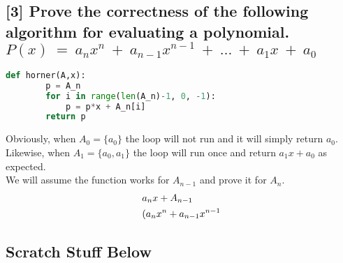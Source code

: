 \documentclass[12pt, letterpaper]{article}
\begin{document}
\subsection{[3] Prove the correctness of the following algorithm for evaluating a polynomial.\\$P(x)~=~a_nx^n~+~a_{n-1}x^{n-1}~+~\dots~+~a_1x~+~a_0$}
    \begin{lstlisting}[language=Python]
    def horner(A,x):
        p = A_n
        for i in range(len(A_n)-1, 0, -1):
            p = p*x + A_n[i]
        return p
    \end{lstlisting}
    Obviously, when $A_0 = \{a_0\}$ the loop will not run and it will simply return $a_0$.\\
    Likewise, when $A_1 = \{a_0,a_1\}$ the loop will run once and return $a_1x + a_0$ as expected.\\
    We will assume the function works for $A_{n-1}$ and prove it for $A_n$.
    \begin{align}\setcounter{equation}{0}
            &a_nx + A_{n-1}\\
            &(a_nx^n + a_{n-1}x^{n-1}
    \end{align}
\subsection{Scratch Stuff Below}


\end{document}
